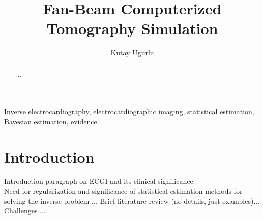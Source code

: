 \documentclass[journal]{IEEEtran}
\title{Fan-Beam Computerized Tomography Simulation}
\author{Kutay Ugurlu}
\begin{document}

\maketitle

\begin{abstract} ... \\
\end{abstract}
\begin{IEEEkeywords}
	Inverse electrocardiography, electrocardiographic imaging, statistical estimation, Bayesian estimation, evidence.
\end{IEEEkeywords}

\section{Introduction}
Introduction paragraph on ECGI and its clinical significance.  \\


Need for regularization and significance of statistical estimation methods for solving the inverse problem ... Brief literature review (no details, just examples)... Challenges ...\\
\end{document}
